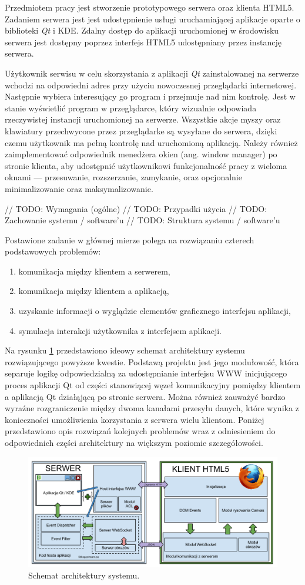 Przedmiotem pracy jest stworzenie prototypowego serwera oraz klienta HTML5. Zadaniem serwera jest jest udostępnienie usługi uruchamiającej aplikacje oparte o biblioteki \emph{Qt} i KDE. Zdalny dostęp do aplikacji uruchomionej w środowisku serwera jest dostępny poprzez interfejs HTML5 udostępniany przez instancję serwera.

Użytkownik serwisu w celu skorzystania z aplikacji \emph{Qt} zainstalowanej na serwerze wchodzi na odpowiedni adres przy użyciu nowoczesnej przeglądarki internetowej. Następnie wybiera interesujący go program i przejmuje nad nim kontrolę. Jest w stanie wyświetlić program w przeglądarce, który wizualnie odpowiada rzeczywistej instancji uruchomionej na serwerze. Wszystkie akcje myszy oraz klawiatury przechwycone przez przeglądarke są wysyłane do serwera, dzięki czemu użytkownik ma pełną kontrolę nad uruchomioną aplikacją. Należy również zaimplementować odpowiednik menedżera okien (ang. window manager) po stronie klienta, aby udostępnić użytkownikowi funkcjonalność pracy z wieloma oknami --- przesuwanie, rozszerzanie, zamykanie, oraz opcjonalnie minimalizowanie oraz maksymalizowanie.

// TODO: Wymagania (ogólne)
// TODO: Przypadki użycia
// TODO: Zachowanie systemu / software'u
// TODO: Struktura systemu / software'u

Postawione zadanie w głównej mierze polega na rozwiązaniu czterech podstawowych problemów:
\begin{enumerate}
  \item komunikacja między klientem a serwerem,
  \item komunikacja między klientem a aplikacją,
  \item uzyskanie informacji o wyglądzie elementów graficznego interfejsu aplikacji,
  \item symulacja interakcji użytkownika z interfejsem aplikacji.
\end{enumerate}

Na rysunku \ref{fig:arch} przedstawiono ideowy schemat architektury systemu rozwiązującego powyższe kwestie. 
Podstawą projektu jest jego modułowość, która separuje logikę odpowiedzialną za udostępnianie interfejsu WWW inicjującego proces aplikacji Qt od części stanowiącej węzeł komunikacyjny pomiędzy klientem a aplikacją Qt działąjącą po stronie serwera.
Można również zauważyć bardzo wyraźne rozgraniczenie między dwoma kanałami przesyłu danych, które wynika z konieczności umożliwienia korzystania z serwera wielu klientom. 
Poniżej przedstawiono opis rozwiązań kolejnych problemów wraz z odniesieniem do odpowiednich części architektury na większym poziomie szczegółowości.

\begin{figure}
\centering
\includegraphics[width=1.0\linewidth]{img/arch}
\caption{Schemat architektury systemu.}
\label{fig:arch}
\end{figure}